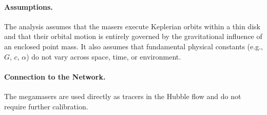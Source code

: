 \paragraph{Assumptions.}
The analysis assumes that the masers execute Keplerian orbits within a thin disk and that their orbital motion is entirely governed by the gravitational influence of an enclosed point mass. It also assumes that fundamental physical constants (e.g., $G$, $c$, $\alpha$) do not vary across space, time, or environment.

\paragraph{Connection to the Network.}
The megamasers are used directly as tracers in the Hubble flow and do not require further calibration.
